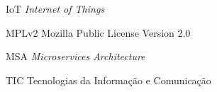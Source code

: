 \begin{siglas}
    \item [IoT] \textit{Internet of Things}
    \item [MPLv2] Mozilla Public License Version 2.0
    \item [MSA] \textit{Microservices Architecture}
    \item [TIC] Tecnologias da Informação e Comunicação
\end{siglas}
